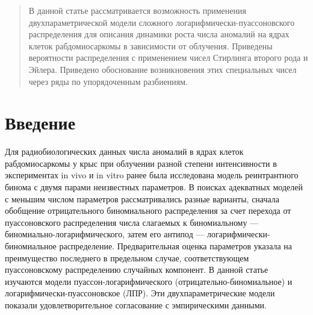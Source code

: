\documentclass{math-mech-sci}
\begin{document}
	\maketitle
	
	\begin{abstract}
		
	В данной статье рассматривается возможность применения двухпараметрической модели  сложного логарифмически-пуассоновского распределения для описания динамики роста числа аномалий на ядрах клеток рабдомиосаркомы в зависимости от облучения. Приведены вероятности распределения  с применением чисел Стирлинга второго рода и Эйлера. Приведено   обоснование возникновения этих специальных чисел  через ряды по упорядоченным разбиениям.  
	
	\end{abstract}
	
	\section{Введение}
	
%	
	
	Для радиобиологических данных числа аномалий в ядрах клеток рабдомиосаркомы у крыс при облучении  разной степени интенсивности в экспериментах in vivo и in vitro ранее была исследована модель реинтрантного бинома с двумя парами неизвестных параметров. В поисках адекватных моделей  с меньшим числом параметров  рассматривались разные варианты, сначала обобщение отрицательного биномиального распределения за счет перехода от пуассоновского распределения числа слагаемых к биномиальному --- биномиально-логарифмического, затем  его антипод --- логарифмически-биномиальное распределение. Предварительная оценка параметров указала на преимущество последнего в предельном случае, соответствующем пуассоновскому распределению случайных компонент. В данной статье изучаются  модели пуассон-логарифмического  (отрицательно-биномиальное) и логарифмически-пуассоновское (ЛПР).  Эти двухпараметрические модели показали удовлетворительное  согласование с эмпирическими данными.
	
\end{document}
